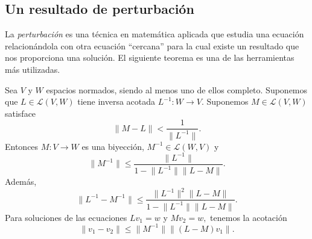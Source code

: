 \subsection{Un resultado de perturbación}
La \textit{perturbación} es una técnica en matemática aplicada que estudia una ecuación relacionándola con otra ecuación ``cercana'' para la cual existe un resultado que nos proporciona una solución. El siguiente teorema es una de las herramientas más utilizadas.

\begin{teorema}
	Sea $V$ y $W$ espacios normados, siendo al menos uno de ellos completo. Suponemos que $L \in \mathcal{L}(V,W)$ tiene inversa acotada $L^{-1}: W \rightarrow V.$ Suponemos $M \in \mathcal{L}(V,W)$ satisface
	\begin{equation}\label{eq:teo7}
		\lVert M-L \rVert < \dfrac{1}{\lVert L^{-1} \rVert}.
	\end{equation}
	Entonces $M:V\rightarrow W$ es una biyección, $M^{-1} \in \mathcal{L}(W,V)$ y 
	\begin{equation}\label{eq:teo5}
		\lVert M^{-1} \rVert \leqslant \dfrac{\lVert L^{-1} \rVert}{1 - \lVert L^{-1} \rVert \lVert L-M \rVert}.
	\end{equation}
	Además,
	\begin{equation}\label{eq:teo4}
		\lVert L^{-1} - M^{-1} \rVert \leqslant \dfrac{\lVert L^{-1} \rVert^2 \lVert L-M \rVert}{1 - \lVert L^{-1} \rVert \lVert L-M \rVert}.
	\end{equation}
	Para soluciones de las ecuaciones $Lv_1 = w$ y $Mv_2 = w,$ tenemos la acotación
	\begin{equation}\label{eq:teo6}
		\lVert v_1 - v_2 \rVert \leqslant \lVert M^{-1} \rVert \lVert (L-M)v_1 \rVert.
	\end{equation}
\end{teorema}
